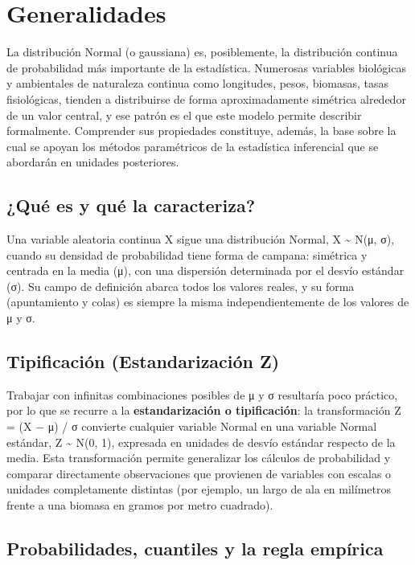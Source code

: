 \documentclass[
  spanish,
  letterpaper,
  DIV=11,
  numbers=noendperiod]{scrreprt}
\begin{document}
\section{Generalidades}\label{generalidades-2}

La distribución Normal (o gaussiana) es, posiblemente, la distribución
continua de probabilidad más importante de la estadística. Numerosas
variables biológicas y ambientales de naturaleza continua como
longitudes, pesos, biomasas, tasas fisiológicas, tienden a distribuirse
de forma aproximadamente simétrica alrededor de un valor central, y ese
patrón es el que este modelo permite describir formalmente. Comprender
sus propiedades constituye, además, la base sobre la cual se apoyan los
métodos paramétricos de la estadística inferencial que se abordarán en
unidades posteriores.

\subsection{¿Qué es y qué la
caracteriza?}\label{quuxe9-es-y-quuxe9-la-caracteriza}

Una variable aleatoria continua X sigue una distribución Normal, X
\textasciitilde{} N(μ, σ), cuando su densidad de probabilidad tiene
forma de campana: simétrica y centrada en la media (μ), con una
dispersión determinada por el desvío estándar (σ). Su campo de
definición abarca todos los valores reales, y su forma (apuntamiento y
colas) es siempre la misma independientemente de los valores de μ y σ.

\subsection{Tipificación (Estandarización
Z)}\label{tipificaciuxf3n-estandarizaciuxf3n-z}

Trabajar con infinitas combinaciones posibles de μ y σ resultaría poco
práctico, por lo que se recurre a la \textbf{estandarización o
tipificación}: la transformación Z = (X − μ) / σ convierte cualquier
variable Normal en una variable Normal estándar, Z \textasciitilde{}
N(0, 1), expresada en unidades de desvío estándar respecto de la media.
Esta transformación permite generalizar los cálculos de probabilidad y
comparar directamente observaciones que provienen de variables con
escalas o unidades completamente distintas (por ejemplo, un largo de ala
en milímetros frente a una biomasa en gramos por metro cuadrado).

\subsection{Probabilidades, cuantiles y la regla
empírica}\label{probabilidades-cuantiles-y-la-regla-empuxedrica}
\end{document}
